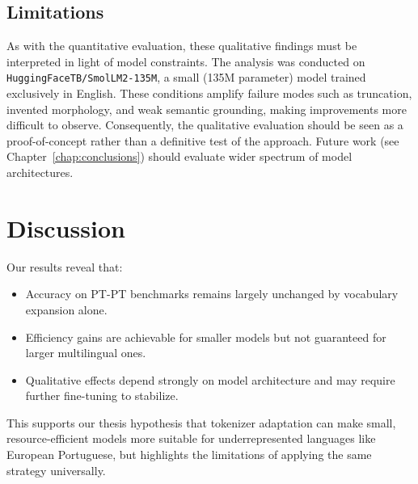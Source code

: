 \subsection*{Limitations}
As with the quantitative evaluation, these qualitative findings must be interpreted in light of model constraints. The analysis was conducted on \texttt{HuggingFaceTB/SmolLM2-135M}, a small (135M parameter) model trained exclusively in English. These conditions amplify failure modes such as truncation, invented morphology, and weak semantic grounding, making improvements more difficult to observe. Consequently, the qualitative evaluation should be seen as a proof-of-concept rather than a definitive test of the approach. Future work (see Chapter~\ref{chap:conclusions}) should evaluate wider spectrum of model architectures.





\section{Discussion}
Our results reveal that:
\begin{itemize}
    \item Accuracy on PT-PT benchmarks remains largely unchanged by vocabulary expansion alone.
    \item Efficiency gains are achievable for smaller models but not guaranteed for larger multilingual ones.
    \item Qualitative effects depend strongly on model architecture and may require further fine-tuning to stabilize.
\end{itemize}

This supports our thesis hypothesis that tokenizer adaptation can make small, resource-efficient models more suitable for underrepresented languages like European Portuguese, but highlights the limitations of applying the same strategy universally.
















